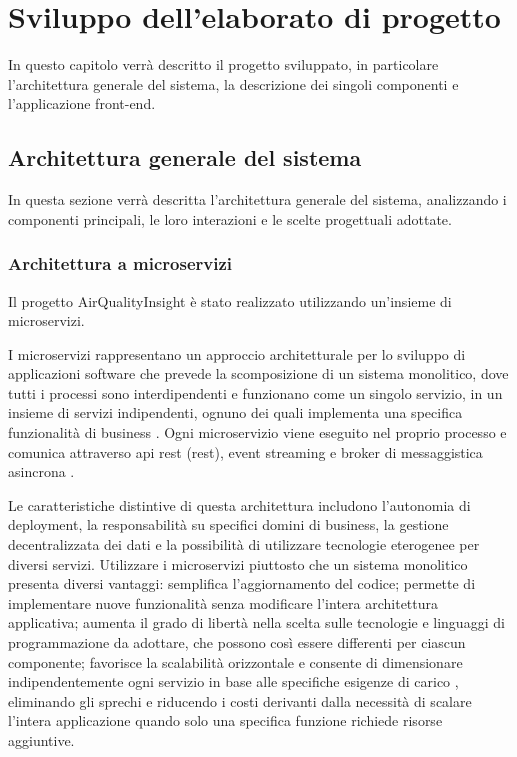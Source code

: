 \clearpage{\pagestyle{empty}\cleardoublepage}
\chapter{Sviluppo dell'elaborato di progetto}

In questo capitolo verrà descritto il progetto sviluppato, in particolare l'architettura generale del sistema,
la descrizione dei singoli componenti e l'applicazione front-end.

\section{Architettura generale del sistema}

In questa sezione verrà descritta l'architettura generale del sistema, analizzando i componenti principali,
le loro interazioni e le scelte progettuali adottate.

\subsection{Architettura a microservizi}

Il progetto AirQualityInsight è stato realizzato utilizzando un'insieme di microservizi.

I microservizi rappresentano un approccio architetturale per lo sviluppo di applicazioni software che prevede
la scomposizione di un sistema monolitico, dove tutti i processi sono interdipendenti e funzionano come un singolo
servizio, in un insieme di servizi indipendenti, ognuno dei quali implementa una specifica funzionalità
di business \cite{newman2015building}. Ogni microservizio viene eseguito nel proprio processo e comunica attraverso
\acrshort{api} \acrshort{rest} (\acrlong{rest}), event streaming e broker di messaggistica asincrona
\cite{fowler2014microservices}.

Le caratteristiche distintive di questa architettura includono l'autonomia di deployment, la responsabilità
su specifici domini di business, la gestione decentralizzata dei dati e la possibilità di utilizzare
tecnologie eterogenee per diversi servizi. Utilizzare i microservizi piuttosto che un sistema monolitico
presenta diversi vantaggi: semplifica l'aggiornamento del codice; permette di implementare nuove funzionalità
senza modificare l'intera architettura applicativa; aumenta il grado di libertà nella scelta sulle
tecnologie e linguaggi di programmazione da adottare, che possono così essere differenti per ciascun componente;
favorisce la scalabilità orizzontale e consente di dimensionare indipendentemente ogni servizio
in base alle specifiche esigenze di carico \cite{dragoni2017microservices}, eliminando gli sprechi e riducendo i costi
derivanti dalla necessità di scalare l'intera applicazione quando solo una specifica funzione
richiede risorse aggiuntive.

